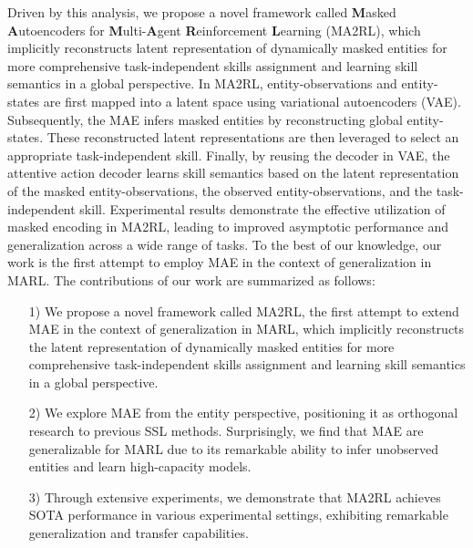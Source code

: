 Driven by this analysis, we propose a novel framework called \textbf{M}asked \textbf{A}utoencoders for \textbf{M}ulti-\textbf{A}gent \textbf{R}einforcement \textbf{L}earning (MA2RL), which implicitly reconstructs latent representation of dynamically masked entities for more comprehensive task-independent skills assignment and learning skill semantics in a global perspective. In MA2RL, entity-observations and entity-states are first mapped into a latent space using variational autoencoders (VAE). Subsequently, the MAE infers masked entities by reconstructing global entity-states. These reconstructed latent representations are then leveraged to select an appropriate task-independent skill. Finally, by reusing the decoder in VAE, the attentive action decoder learns skill semantics based on the latent representation of the masked entity-observations, the observed entity-observations, and the task-independent skill. Experimental results demonstrate the effective utilization of masked encoding in MA2RL, leading to improved asymptotic performance and generalization across a wide range of tasks. To the best of our knowledge, our work is the first attempt to employ MAE in the context of generalization in MARL. The contributions of our work are summarized as follows:
\begin{enumerate}
  \item[1)] We propose a novel framework called MA2RL, the first attempt to extend MAE in the context of generalization in MARL, which implicitly reconstructs the latent representation of dynamically masked entities for more comprehensive task-independent skills assignment and learning skill semantics in a global perspective.
  \item[2)] We explore MAE from the entity perspective, positioning it as orthogonal research to previous SSL methods. Surprisingly, we find that MAE are generalizable for MARL due to its remarkable ability to infer unobserved entities and learn high-capacity models.
  \item[3)] Through extensive experiments, we demonstrate that MA2RL achieves SOTA performance in various experimental settings, exhibiting remarkable generalization and transfer capabilities.
\end{enumerate}

